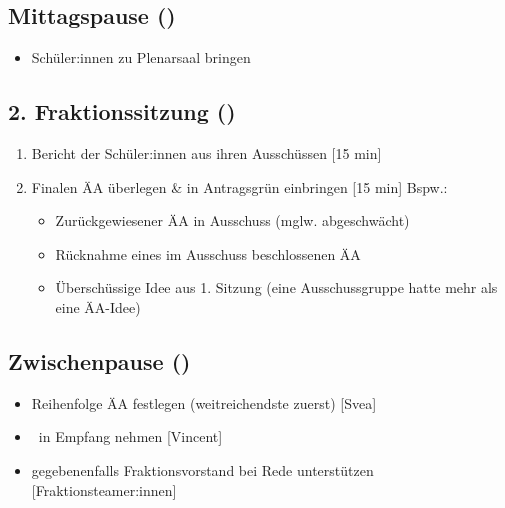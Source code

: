 \documentclass{article}
\newcommand{\KOM}{Vincent}
\newcommand{\EP}{Svea}
\newcommand{\KOM}{Svea}
\newcommand{\EP}{Vincent}
\begin{document}
	\subsection{Mittagspause (\timeMittag)}
	\begin{itemize}
		\item Schüler:innen zu Plenarsaal bringen
	\end{itemize}
	
	\subsection{2. Fraktionssitzung (\timeFrakTwo)}
	\begin{enumerate}
		\item Bericht der Schüler:innen aus ihren Ausschüssen [15 min]
		\item Finalen ÄA überlegen \& in Antragsgrün einbringen [15 min] \newline Bspw.:
		\begin{itemize}
			\item Zurückgewiesener ÄA in Ausschuss (mglw. abgeschwächt)
			\item Rücknahme eines im Ausschuss beschlossenen ÄA
			\item Überschüssige Idee aus 1. Sitzung \newline (eine Ausschussgruppe hatte mehr als eine ÄA-Idee)
		\end{itemize}
	\end{enumerate}
	
	\subsection{Zwischenpause (\timePauseTwo)}
	\begin{itemize}
		\item Reihenfolge ÄA festlegen (weitreichendste zuerst) [\EP]
		\item \stadtvertreter\ in Empfang nehmen [\KOM]
		\item gegebenenfalls Fraktionsvorstand bei Rede unterstützen [Fraktionsteamer:innen]
	\end{itemize}
	
\end{document}
